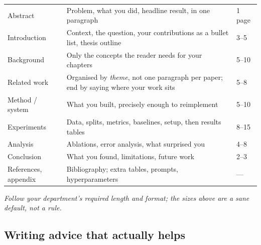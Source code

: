 \documentclass[11pt,a4paper]{article}
\begin{document}
\begin{center}
\small
\begin{tabularx}{\textwidth}{L{3.5cm} X L{2.0cm}}
\toprule
{} &  &  \\
\midrule
{}
Abstract & Problem, what you did, headline result, in one paragraph & 1 page \\
Introduction & Context, the question, your contributions as a bullet list,
thesis outline & 3--5 \\
Background & Only the concepts the reader needs for your chapters & 5--10 \\
Related work & Organised by \emph{theme}, not one paragraph per paper; end by
saying where your work sits & 5--8 \\
Method / system & What you built, precisely enough to reimplement & 5--10 \\
Experiments & Data, splits, metrics, baselines, setup, then results tables &
8--15 \\
Analysis & Ablations, error analysis, what surprised you & 4--8 \\
Conclusion & What you found, limitations, future work & 2--3 \\
References, appendix & Bibliography; extra tables, prompts, hyperparameters &
--- \\
\bottomrule
\end{tabularx}
\end{center}

\emph{Follow your department's required length and format; the sizes above are
a sane default, not a rule.}

\subsection{Writing advice that actually helps}
\end{document}
